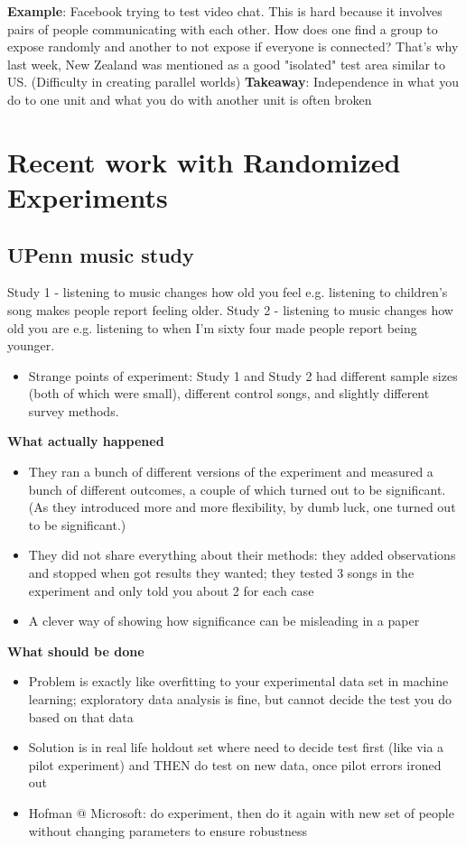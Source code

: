 \textbf{Example}: Facebook trying to test video chat. This is hard because it involves pairs of people communicating with each other. How does one find a group to expose randomly and another to not expose if everyone is connected? That's why last week, New Zealand was mentioned as a good "isolated" test area similar to US. (Difficulty in creating parallel worlds) \newline
\textbf{Takeaway}: Independence in what you do to one unit and what you do with another unit is often broken

\section{Recent work with Randomized Experiments}
\subsection{UPenn music study }
Study 1 - listening to music changes how old you feel e.g. listening to children's song makes people report feeling older. Study 2 - listening to music changes how old you are e.g. listening to when I'm sixty four made people report being younger. 
\begin{itemize}
\item Strange points of experiment: Study 1 and Study 2 had different sample sizes (both of which were small), different control songs, and slightly different survey methods. 
\end{itemize}
\textbf{What actually happened}
\begin{itemize}
\item They ran a bunch of different versions of the experiment and measured a bunch of different outcomes, a couple of which turned out to be significant. (As they introduced more and more flexibility, by dumb luck, one turned out to be significant.)
\item They did not share everything about their methods: they added observations and stopped when got results they wanted; they tested 3 songs in the experiment and only told you about 2 for each case
\item A clever way of showing how significance can be misleading in a paper
\end{itemize}
\textbf{What should be done } 
\begin{itemize}
\item Problem is exactly like overfitting to your experimental data set in machine learning; exploratory data analysis is fine, but cannot decide the test you do based on that data
\item Solution is in real life holdout set where need to decide test first (like via a pilot experiment) and THEN do test on new data, once pilot errors ironed out
\item Hofman @ Microsoft: do experiment, then do it again with new set of people without changing parameters to ensure robustness 
\end{itemize}
